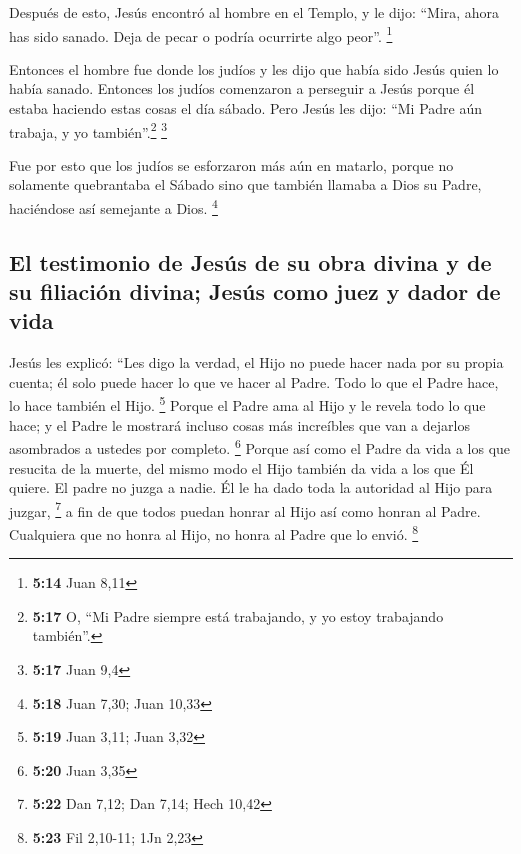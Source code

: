  Después de esto, Jesús encontró al hombre en el Templo,
y le dijo: ``Mira, ahora has sido sanado. Deja de pecar o podría
ocurrirte algo peor''. \footnote{\textbf{5:14} Juan 8,11}

 Entonces el hombre fue donde los judíos y les dijo que
había sido Jesús quien lo había sanado.  Entonces los
judíos comenzaron a perseguir a Jesús porque él estaba haciendo estas
cosas el día sábado.  Pero Jesús les dijo: ``Mi Padre aún
trabaja, y yo también''.\footnote{\textbf{5:17} O, ``Mi Padre siempre
  está trabajando, y yo estoy trabajando también''.} \footnote{\textbf{5:17}
  Juan 9,4}

 Fue por esto que los judíos se esforzaron más aún en
matarlo, porque no solamente quebrantaba el Sábado sino que también
llamaba a Dios su Padre, haciéndose así semejante a Dios. \footnote{\textbf{5:18}
  Juan 7,30; Juan 10,33}

\hypertarget{el-testimonio-de-jesuxfas-de-su-obra-divina-y-de-su-filiaciuxf3n-divina-jesuxfas-como-juez-y-dador-de-vida}{%
\subsection{El testimonio de Jesús de su obra divina y de su filiación
divina; Jesús como juez y dador de
vida}\label{el-testimonio-de-jesuxfas-de-su-obra-divina-y-de-su-filiaciuxf3n-divina-jesuxfas-como-juez-y-dador-de-vida}}

 Jesús les explicó: ``Les digo la verdad, el Hijo no
puede hacer nada por su propia cuenta; él solo puede hacer lo que ve
hacer al Padre. Todo lo que el Padre hace, lo hace también el Hijo.
\footnote{\textbf{5:19} Juan 3,11; Juan 3,32}  Porque el
Padre ama al Hijo y le revela todo lo que hace; y el Padre le mostrará
incluso cosas más increíbles que van a dejarlos asombrados a ustedes por
completo. \footnote{\textbf{5:20} Juan 3,35}  Porque así
como el Padre da vida a los que resucita de la muerte, del mismo modo el
Hijo también da vida a los que Él quiere.  El padre no
juzga a nadie. Él le ha dado toda la autoridad al Hijo para juzgar,
\footnote{\textbf{5:22} Dan 7,12; Dan 7,14; Hech 10,42} 
a fin de que todos puedan honrar al Hijo así como honran al Padre.
Cualquiera que no honra al Hijo, no honra al Padre que lo envió.
\footnote{\textbf{5:23} Fil 2,10-11; 1Jn 2,23}

